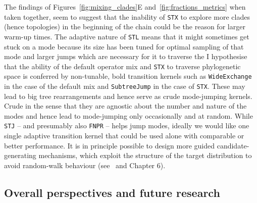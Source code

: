 The findings of Figures~\ref{fig:mixing_clades}E and~\ref{fig:fractions_metrics} when taken together, seem to suggest that the inability of \verb|STX| to explore more clades (hence topologies) in the beginning of the chain could be the reason for larger warm-up times.
The adaptive nature of \verb|STL| means that it might sometimes get stuck on a mode because its size has been tuned for optimal sampling of that mode and larger jumps which are necessary for it to traverse the 
I hypothesise that the ability of the default operator mix and \verb|STX| to traverse phylogenetic space is conferred by non-tunable, bold transition kernels such as \verb|WideExchange| in the case of the default mix and \verb|SubtreeJump| in the case of \verb|STX|.
These may lead to big tree rearrangements and hence serve as crude mode-jumping kernels.
Crude in the sense that they are agnostic about the number and nature of the modes and hence lead to mode-jumping only occasionally and at random.
While \verb|STJ| -- and presumably also \verb|FNPR| --  helps jump modes, ideally we would like one single adaptive transition kernel that could be used alone with comparable or better performance.
It is in principle possible to design more guided candidate-generating mechanisms, which exploit the structure of the target distribution to avoid random-walk behaviour (see~\cite{Hoehna2012} and Chapter 6).

\subsection{Overall perspectives and future research}
\label{sec:performance_discussion}

